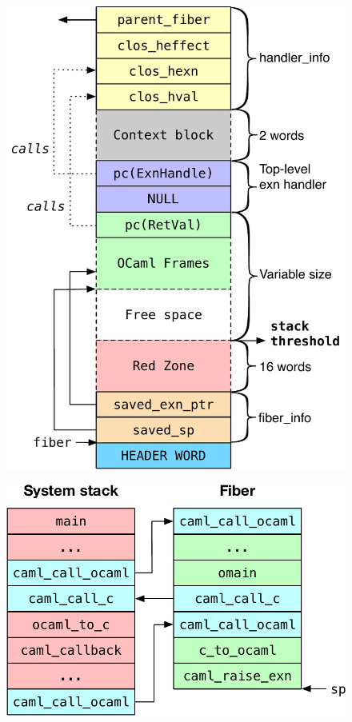 \documentclass[sigplan,10pt,review,anonymous]{acmart}\settopmatter{printfolios=true,printccs=false,printacmref=false}
\begin{document}
\begin{figure}
\begin{minipage}{0.35\linewidth}
  \centering
  \includegraphics[scale=0.45]{figures/fiber}
  \label{fig:fiber}
\end{minipage}
\begin{minipage}{0.64\linewidth}
  \begin{minipage}{\linewidth}
    \centering
    \includegraphics[scale=0.4]{figures/multicore_stack}

\end{minipage}
\end{minipage}
\end{figure}
\end{document}
